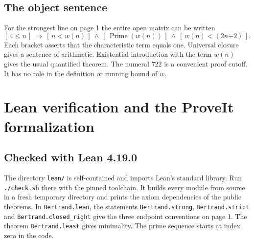 \documentclass[12pt,letterpaper]{article}
\newcommand{\Prime}{\operatorname{Prime}}
\newcommand{\w}{w}
\newcommand{\dotminus}{\mathbin{\dot{-}}}
\newcommand{\code}[1]{\texttt{\small #1}}
\newcommand{\pagepart}{\clearpage}
\begin{document}
\subsection*{The object sentence}
For the strongest line on page 1 the entire open matrix can be written
\[
 [\,4\le n\,]\ \Longrightarrow\
 [\,n<\w(n)\,]\ \land\ [\,\Prime(\w(n))\,]\ \land\
 [\,\w(n)<(2n\dotminus2)\,].
\]
Each bracket asserts that the characteristic term equals one. Universal closure gives a sentence of arithmetic. Existential introduction with the term \(\w(n)\) gives the usual quantified theorem. The numeral \(722\) is a convenient proof cutoff. It has no role in the definition or running bound of \(\w\).
\pagepart\section{Lean verification and the ProveIt formalization}\label{s:lean}
\subsection*{Checked with Lean 4.19.0}
The directory \code{lean/} is self-contained and imports Lean's standard library. Run \code{./check.sh} there with the pinned toolchain. It builds every module from source in a fresh temporary directory and prints the axiom dependencies of the public theorems. In \code{Bertrand.lean}, the statements \code{Bertrand.strong}, \code{Bertrand.strict} and \code{Bertrand.closed\_right} give the three endpoint conventions on page 1. The theorem \code{Bertrand.least} gives minimality. The prime sequence starts at index zero in the code.
\end{document}
